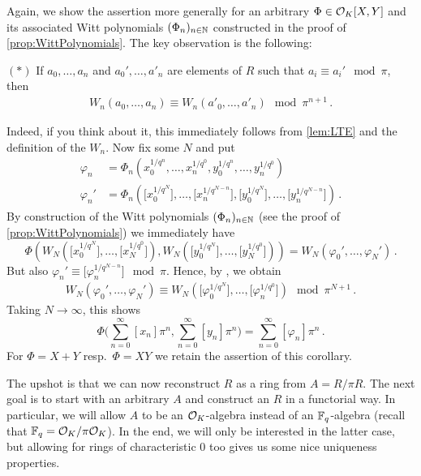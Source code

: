 \documentclass[a4paper, 10pt, oneside, DIV=9, chapterprefix=true, numbers=enddot,bibliography=totoc]{scrbook}
\begin{document}
\begin{proof*}
	Again, we show the assertion more generally for an arbitrary $\Phi\in\mathcal{O}_K[X,Y]$ and its associated Witt polynomials $(\Phi_n)_{n\in\mathbb{N}}$ constructed in the proof of \cref{prop:WittPolynomials}. The key observation is the following:
	\begin{numerate}
		\item[$(*)$] If $a_0,\dotsc,a_n$ and $a_0',\dotsc,a'_n$ are elements of $R$ such that $a_i\equiv a_i'\mod \pi$, then
		\begin{align*}
			W_n(a_0,\dotsc,a_n)\equiv W_n(a'_0,\dotsc,a'_n)\mod \pi^{n+1}\,.
		\end{align*}
	\end{numerate}
	Indeed, if you think about it, this immediately follows from \cref{lem:LTE} and the definition of the $W_n$. Now fix some $N$ and put
	\begin{align*}
		\varphi_n&=\Phi_n\left(x_0^{1/q^n},\dotsc,x_n^{1/q^0},y_0^{1/q^n},\dotsc,y_n^{1/q^0}\right)\\
		\varphi_n'&=\Phi_n\left(\big[x_0^{1/q^N}\big],\dotsc,\big[x_n^{1/q^{N-n}}\big],\big[y_0^{1/q^N}\big],\dotsc,\big[y_n^{1/q^{N-n}}\big]\right)\,.
	\end{align*}
	By construction of the Witt polynomials $(\Phi_n)_{n\in\mathbb{N}}$ (see the proof of \cref{prop:WittPolynomials}) we immediately have 
	\begin{equation*}
		\Phi\left(W_N\left(\big[x_0^{1/q^N}\big],\dotsc,\big[x_N^{1/q^0}\big]\right),W_N\left(\big[y_0^{1/q^N}\big],\dotsc,\big[y_N^{1/q^0}\big]\right)\right)= W_N(\varphi_0',\dotsc,\varphi_N')\,.
	\end{equation*}
	But also $\varphi_n'\equiv\big[\varphi_n^{1/q^{N-n}}\big]\mod \pi$. Hence, by \itememph{*}, we obtain
	\begin{align*}
		W_N(\varphi_0',\dotsc,\varphi_N')\equiv W_N\left(\big[\varphi_0^{1/q^N}\big],\dotsc,\big[\varphi_n^{1/q^{0}}\big]\right)\mod \pi^{N+1}\,.
	\end{align*}
	Taking $N\rightarrow\infty$, this shows
	\begin{equation*}
		\Phi\Bigg(\sum_{n=0}^\infty[x_n]\pi^n,\sum_{n=0}^\infty[y_n]\pi^n\Bigg)=\sum_{n=0}^\infty[\varphi_n]\pi^n\,.
	\end{equation*}
	For $\Phi=X+Y$ resp.\ $\Phi=XY$ we retain the assertion of this corollary.
\end{proof*}
The upshot is that we can now reconstruct $R$ as a ring from $A=R/\pi R$. The next goal is to start with an arbitrary $A$ and construct an $R$ in a functorial way. In particular, we will allow $A$ to be an $\mathcal{O}_K$-algebra instead of an $\mathbb{F}_q$-algebra (recall that $\mathbb{F}_q=\mathcal{O}_K/\pi\mathcal{O}_K$). In the end, we will only be interested in the latter case, but allowing for rings of characteristic $0$ too gives us some nice uniqueness properties.
\end{document}
